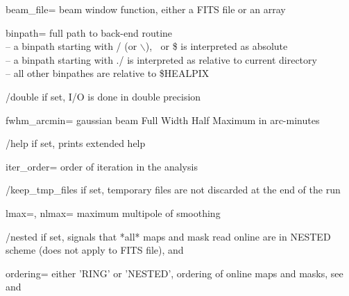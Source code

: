 \begin{keywords}
  \begin{kwlist}{} %
 \item[beam\_file=]  beam window function, either a FITS file or an array

 \item[binpath=]  full path to back-end routine \\
              -- a binpath starting with / (or $\backslash$), $~$ or \$ is interpreted as absolute\\
              -- a binpath starting with ./ is interpreted as relative to current directory\\
              -- all other binpathes are relative to \$HEALPIX

 \item[/double]  if set, I/O is done in double precision 

 \item[fwhm\_arcmin=]  gaussian beam Full Width Half Maximum in arc-minutes 

 \item[/help]       if set, prints extended help

\item[iter\_order=]  order of iteration in the analysis 

\item[/keep\_tmp\_files]  if set, temporary files are not discarded at the end of the
                  run

 \item[lmax=, nlmax=]    maximum multipole of smoothing 

\item[/nested]  if set, signals that *all* maps and mask read online are in
   NESTED scheme (does not apply to FITS file), 
 and 

\item[ordering=]  either 'RING' or 'NESTED', ordering of online maps and masks,
see 
 and 


\end{kwlist}
\end{keywords}
